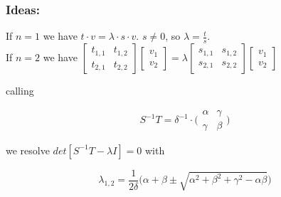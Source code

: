 \documentclass{beamer}
\theoremstyle{definition} \newtheorem{de}{Def}
\theoremstyle{remark} \newtheorem{os}[de]{Remark}
\theoremstyle{plain} \newtheorem{te}[de]{Teo}
\theoremstyle{plain} \newtheorem{co}[de]{Cor}
\theoremstyle{plain} \newtheorem{pr}[de]{Prop}
\theoremstyle{plain} \newtheorem{lem}[de]{Lemm}
\theoremstyle{remark} \newtheorem{rem}[de]{Remark}
\begin{document}
\begin{frame}
  \frametitle{Ideas:}
  If $n=1$ we have $t\cdot v=\lambda\cdot s\cdot v$. $s\ne 0$, so 
  $\lambda= \frac{t}{s}$.\\
  
  If $n=2$ we have $\begin{bmatrix}t_{1,1}&t_{1,2}\\ t_{2,1} & t_{2,2}\end{bmatrix} \begin{bmatrix}v_{1} \\ v_{2}\end{bmatrix} = \lambda \begin{bmatrix}s_{1,1} & s_{1,2}\\ s_{2,1} & s_{2,2}\end{bmatrix} \begin{bmatrix}v_{1} \\ v_{2}\end{bmatrix}$
  
  
  calling 

  \begin{equation*}
    S^{-1}T = \delta^{-1} \cdot \Big( \begin{matrix} \alpha & \gamma \\ \gamma & \beta \end{matrix}\Big)
  \end{equation*}

  we resolve $det[ S^{-1}T - \lambda I ]=0$ with

  \begin{equation*}
    \lambda_{1,2} = \frac{1}{2\delta}  
  \big( \alpha+\beta \pm \sqrt{ \alpha^2 + \beta^2 + 
  \gamma^2 - \alpha\beta } \big)
  \end{equation*}

\end{frame}
\end{document}
